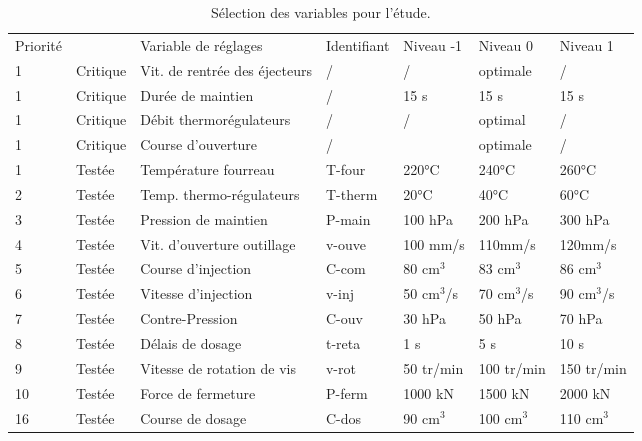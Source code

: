 \begin{table}[]
    \centering
    \begin{tabular}{|l|l|l|l|l|l|l|}
        \arrayrulecolor{black}
        \hhline{-~-----}
        Priorité &          & Variable de réglages          & Identifiant & Niveau -1 & Niveau 0   & Niveau 1   \\ \hhline{=:-:=:=:=:=:=:} %
        1        & Critique & Vit. de rentrée des éjecteurs & /           & /         & optimale   & /          \\ \hline
        1        & Critique & Durée de maintien             & /           & 15 s      & 15 s       & 15 s       \\ \hline
        1        & Critique & Débit thermorégulateurs       & /           & /         & optimal    & /          \\ \hline
        1        & Critique & Course d'ouverture            & /           &           & optimale   & /          \\ \hline
        1        & Testée   & Température fourreau          & T-four      & 220°C     & 240°C      & 260°C      \\ \hline
        2        & Testée   & Temp. thermo-régulateurs      & T-therm     & 20°C      & 40°C       & 60°C       \\ \hline
        3        & Testée   & Pression de maintien          & P-main      & 100 hPa   & 200 hPa    & 300 hPa    \\ \hline
        4        & Testée   & Vit. d'ouverture outillage    & v-ouve      & 100 mm/s  & 110mm/s    & 120mm/s    \\ \hline
        5        & Testée   & Course d'injection            & C-com       & 80 cm$^3$ & 83 cm$^3$  & 86 cm$^3$     \\ \hline
        6        & Testée   & Vitesse d'injection           & v-inj    & 50 cm$^3$/s & 70 cm$^3$/s & 90 cm$^3$/s   \\ \hline
        7        & Testée   & Contre-Pression               & C-ouv       & 30 hPa    & 50 hPa     & 70 hPa     \\ \hline
        8        & Testée   & Délais de dosage              & t-reta      & 1 s       & 5 s        & 10 s       \\ \hline
        9        & Testée   & Vitesse de rotation de vis    & v-rot       & 50 tr/min & 100 tr/min & 150 tr/min \\ \hline
        10       & Testée   & Force de fermeture            & P-ferm      & 1000 kN   & 1500 kN    & 2000 kN    \\ \hline
        16       & Testée   & Course de dosage              & C-dos       & 90 cm$^3$ & 100 cm$^3$ & 110 cm$^3$    \\ \hline
    \end{tabular}
    \caption{Sélection des variables pour l'étude.}
    \label{tab:doe_choice}
\end{table}

